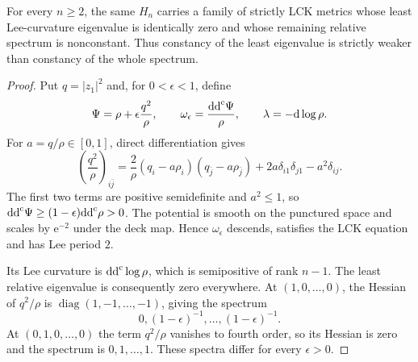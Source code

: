 \begin{example}\label{lck:variable-positive-lee-spectrum}
For every $n\geq2$, the same $H_n$ carries a family of strictly
LCK metrics whose least Lee-curvature eigenvalue is identically
zero and whose remaining relative spectrum is nonconstant.
Thus constancy of the least eigenvalue is strictly weaker than
constancy of the whole spectrum.
\end{example}
\begin{proof}
Put $q=|z_1|^2$ and, for $0<\epsilon<1$, define
\[
 \Psi=\rho+\epsilon\frac{q^2}{\rho},\qquad
 \omega_\epsilon=\frac{\mathrm{dd}^{\mathrm{c}}\Psi}{\rho},\qquad
 \lambda=-\mathrm d\log\rho.
\]
For $a=q/\rho\in[0,1]$, direct differentiation gives
\[
 \left(\frac{q^2}{\rho}\right)_{i\bar j}
 =\frac{2}{\rho}(q_i-a\rho_i)(q_{\bar j}-a\rho_{\bar j})
       +2a\delta_{i1}\delta_{j1}-a^2\delta_{ij}.
\]
The first two terms are positive semidefinite and $a^2\leq1$,
so $\mathrm{dd}^{\mathrm{c}}\Psi\geq(1-\epsilon)\mathrm{dd}^{\mathrm{c}}\rho>0$.
The potential is smooth on the punctured space and scales by
$\mathrm e^{-2}$ under the deck map. Hence $\omega_\epsilon$ descends,
satisfies the LCK equation and has Lee period $2$.

Its Lee curvature is $\mathrm{dd}^{\mathrm{c}}\log\rho$, which is semipositive
of rank $n-1$. The least relative eigenvalue is consequently
zero everywhere. At $(1,0,\ldots,0)$, the Hessian of
$q^2/\rho$ is $\operatorname{diag}(1,-1,\ldots,-1)$, giving
the spectrum
\[
 0,(1-\epsilon)^{-1},\ldots,(1-\epsilon)^{-1}.
\]
At $(0,1,0,\ldots,0)$ the term $q^2/\rho$ vanishes to fourth
order, so its Hessian is zero and the spectrum is
$0,1,\ldots,1$. These spectra differ for every $\epsilon>0$.
\end{proof}
